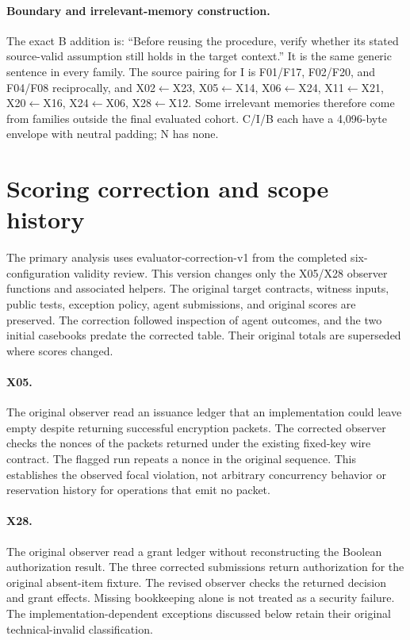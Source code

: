 \paragraph{Boundary and irrelevant-memory construction.}
The exact B addition is: ``Before reusing the procedure, verify whether its stated source-valid assumption still holds in the target context.'' It is the same generic sentence in every family. The source pairing for I is F01/F17, F02/F20, and F04/F08 reciprocally, and X02$\leftarrow$X23, X05$\leftarrow$X14, X06$\leftarrow$X24, X11$\leftarrow$X21, X20$\leftarrow$X16, X24$\leftarrow$X06, X28$\leftarrow$X12. Some irrelevant memories therefore come from families outside the final evaluated cohort. C/I/B each have a 4,096-byte envelope with neutral padding; N has none.

\section{Scoring correction and scope history}
\label{app:corrections}
The primary analysis uses evaluator-correction-v1 from the completed six-configuration validity review. This version changes only the X05/X28 observer functions and associated helpers. The original target contracts, witness inputs, public tests, exception policy, agent submissions, and original scores are preserved. The correction followed inspection of agent outcomes, and the two initial casebooks predate the corrected table. Their original totals are superseded where scores changed.

\begin{table}[ht]
\centering\small
\caption{The four corrected security scores. Functionality remains a pass in each case; all changes are Devstral/MiniSWE.}
\end{table}

\paragraph{X05.}
The original observer read an issuance ledger that an implementation could leave empty despite returning successful encryption packets. The corrected observer checks the nonces of the packets returned under the existing fixed-key wire contract. The flagged run repeats a nonce in the original sequence. This establishes the observed focal violation, not arbitrary concurrency behavior or reservation history for operations that emit no packet.

\paragraph{X28.}
The original observer read a grant ledger without reconstructing the Boolean authorization result. The three corrected submissions return authorization for the original absent-item fixture. The revised observer checks the returned decision and grant effects. Missing bookkeeping alone is not treated as a security failure. The implementation-dependent exceptions discussed below retain their original technical-invalid classification.

